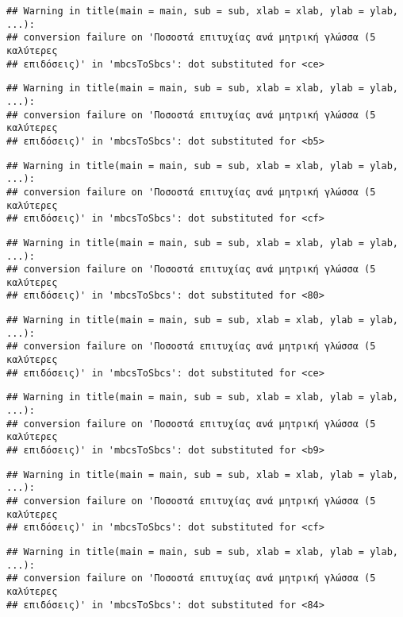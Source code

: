 \documentclass[
]{article}
\begin{document}
\begin{verbatim}
## Warning in title(main = main, sub = sub, xlab = xlab, ylab = ylab, ...):
## conversion failure on 'Ποσοστά επιτυχίας ανά μητρική γλώσσα (5 καλύτερες
## επιδόσεις)' in 'mbcsToSbcs': dot substituted for <ce>
\end{verbatim}

\begin{verbatim}
## Warning in title(main = main, sub = sub, xlab = xlab, ylab = ylab, ...):
## conversion failure on 'Ποσοστά επιτυχίας ανά μητρική γλώσσα (5 καλύτερες
## επιδόσεις)' in 'mbcsToSbcs': dot substituted for <b5>
\end{verbatim}

\begin{verbatim}
## Warning in title(main = main, sub = sub, xlab = xlab, ylab = ylab, ...):
## conversion failure on 'Ποσοστά επιτυχίας ανά μητρική γλώσσα (5 καλύτερες
## επιδόσεις)' in 'mbcsToSbcs': dot substituted for <cf>
\end{verbatim}

\begin{verbatim}
## Warning in title(main = main, sub = sub, xlab = xlab, ylab = ylab, ...):
## conversion failure on 'Ποσοστά επιτυχίας ανά μητρική γλώσσα (5 καλύτερες
## επιδόσεις)' in 'mbcsToSbcs': dot substituted for <80>
\end{verbatim}

\begin{verbatim}
## Warning in title(main = main, sub = sub, xlab = xlab, ylab = ylab, ...):
## conversion failure on 'Ποσοστά επιτυχίας ανά μητρική γλώσσα (5 καλύτερες
## επιδόσεις)' in 'mbcsToSbcs': dot substituted for <ce>
\end{verbatim}

\begin{verbatim}
## Warning in title(main = main, sub = sub, xlab = xlab, ylab = ylab, ...):
## conversion failure on 'Ποσοστά επιτυχίας ανά μητρική γλώσσα (5 καλύτερες
## επιδόσεις)' in 'mbcsToSbcs': dot substituted for <b9>
\end{verbatim}

\begin{verbatim}
## Warning in title(main = main, sub = sub, xlab = xlab, ylab = ylab, ...):
## conversion failure on 'Ποσοστά επιτυχίας ανά μητρική γλώσσα (5 καλύτερες
## επιδόσεις)' in 'mbcsToSbcs': dot substituted for <cf>
\end{verbatim}

\begin{verbatim}
## Warning in title(main = main, sub = sub, xlab = xlab, ylab = ylab, ...):
## conversion failure on 'Ποσοστά επιτυχίας ανά μητρική γλώσσα (5 καλύτερες
## επιδόσεις)' in 'mbcsToSbcs': dot substituted for <84>
\end{verbatim}
\end{document}
